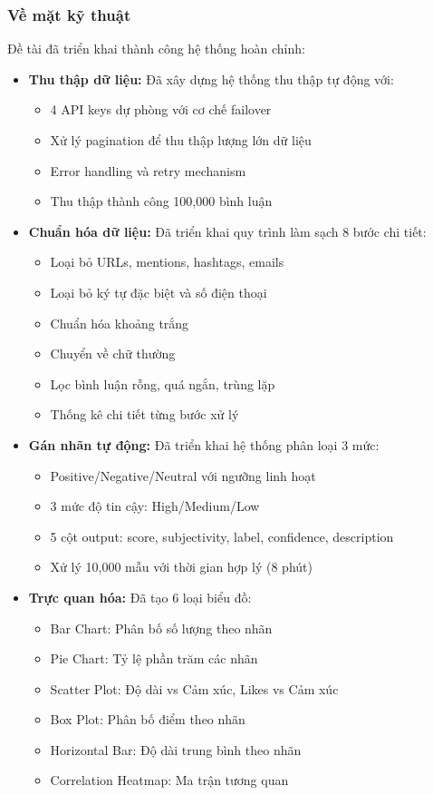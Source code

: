 \subsubsection{Về mặt kỹ thuật}
Đề tài đã triển khai thành công hệ thống hoàn chỉnh:

\begin{itemize}
    \item \textbf{Thu thập dữ liệu:} Đã xây dựng hệ thống thu thập tự động với:
    \begin{itemize}
        \item 4 API keys dự phòng với cơ chế failover
        \item Xử lý pagination để thu thập lượng lớn dữ liệu
        \item Error handling và retry mechanism
        \item Thu thập thành công 100,000 bình luận
    \end{itemize}
    
    \item \textbf{Chuẩn hóa dữ liệu:} Đã triển khai quy trình làm sạch 8 bước chi tiết:
    \begin{itemize}
        \item Loại bỏ URLs, mentions, hashtags, emails
        \item Loại bỏ ký tự đặc biệt và số điện thoại
        \item Chuẩn hóa khoảng trắng
        \item Chuyển về chữ thường
        \item Lọc bình luận rỗng, quá ngắn, trùng lặp
        \item Thống kê chi tiết từng bước xử lý
    \end{itemize}
    
    \item \textbf{Gán nhãn tự động:} Đã triển khai hệ thống phân loại 3 mức:
    \begin{itemize}
        \item Positive/Negative/Neutral với ngưỡng linh hoạt
        \item 3 mức độ tin cậy: High/Medium/Low
        \item 5 cột output: score, subjectivity, label, confidence, description
        \item Xử lý 10,000 mẫu với thời gian hợp lý (8 phút)
    \end{itemize}
    
    \item \textbf{Trực quan hóa:} Đã tạo 6 loại biểu đồ:
    \begin{itemize}
        \item Bar Chart: Phân bố số lượng theo nhãn
        \item Pie Chart: Tỷ lệ phần trăm các nhãn
        \item Scatter Plot: Độ dài vs Cảm xúc, Likes vs Cảm xúc
        \item Box Plot: Phân bố điểm theo nhãn
        \item Horizontal Bar: Độ dài trung bình theo nhãn
        \item Correlation Heatmap: Ma trận tương quan
    \end{itemize}
    

\end{itemize}
